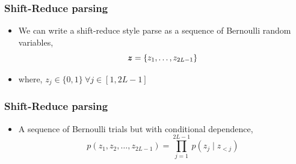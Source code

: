 \begin{frame}
\begin{figure}
\end{figure}
\end{frame}%



\begin{frame}
\frametitle{Shift-Reduce parsing}
\begin{itemize}
\item[] We can write a shift-reduce style parse as a sequence of Bernoulli random variables,
$$ \boldsymbol{z} = \{z_1, \ldots, z_{2L-1}\}$$
\item[] where, $z_j \in \{0,1\} \ \forall j\in[1,2L-1]$
\end{itemize}
\end{frame}

\begin{frame}
\frametitle{Shift-Reduce parsing}
\begin{itemize}
\item[] A sequence of Bernoulli trials but with conditional dependence,
$$p(z_1, z_2, \ldots, z_{2L-1}) = \displaystyle\prod_{j=1}^{2L-1} p(z_j \mid z_{<j})$$
\end{itemize}
\end{frame}




